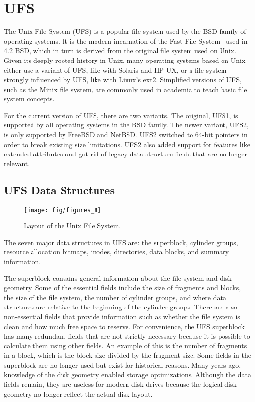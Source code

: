 \section{UFS}
\label{sec:ufs}

The Unix File System (UFS) is a popular file system used by the BSD family of
operating systems. It is the modern incarnation of the Fast File
System~\cite{mckusick84fast} used in 4.2 BSD, which in turn is derived from the
original file system used on Unix. Given its deeply rooted history in Unix,
many operating systems based on Unix either use a variant of UFS, like with
Solaris and HP-UX, or a file system strongly influenced by UFS, like with
Linux's ext2. Simplified versions of UFS, such as the Minix file system, are
commonly used in academia to teach basic file system concepts.

For the current version of UFS, there are two variants. The original, UFS1, is
supported by all operating systems in the BSD family. The newer variant, UFS2,
is only supported by FreeBSD and NetBSD. UFS2 switched to 64-bit pointers in
order to break existing size limitations. UFS2 also added support for features
like extended attributes and got rid of legacy data structure fields that are
no longer relevant.

\subsection{UFS Data Structures}
\label{sec:ufs:structs}

\begin{figure}[htb]
  \centering
  \texttt{[image: fig/figures\_8]}
  \caption{\label{fig:ufs_sb} Layout of the Unix File System.}
\end{figure}

The seven major data structures in UFS are: the superblock, cylinder groups,
resource allocation bitmaps, inodes, directories, data blocks, and summary
information.

The superblock contains general information about the file system and disk
geometry. Some of the essential fields include the size of fragments and
blocks, the size of the file system, the number of cylinder groups, and where
data structures are relative to the beginning of the cylinder groups. There
are also non-essential fields that provide information such as whether the
file system is clean and how much free space to reserve. For convenience, the
UFS superblock has many redundant fields that are not strictly necessary
because it is possible to calculate them using other fields. An example of this
is the number of fragments in a block, which is the block size divided by the
fragment size. Some fields in the superblock are no longer used but exist for
historical reasons. Many years ago, knowledge of the disk geometry enabled
storage optimizations. Although the data fields remain, they are useless for
modern disk drives because the logical disk geometry no longer reflect the
actual disk layout.

